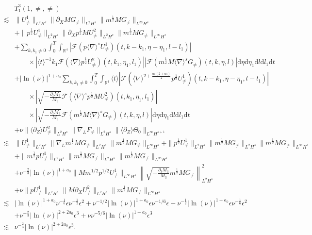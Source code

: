 \documentclass[12pt]{article}
\def\d{\mathrm{d}}
\newcommand{\wtb}{\langle\partial_Z\rangle }
\numberwithin{equation}{section}
\begin{document}
	\begin{align*}
		&T^3_1(1,\neq,\neq)\\\lesssim&\|U^1_{\neq}\|_{L^2H^s}\|\partial_XMG_{\neq}\|_{L^2H^s}\|m^{\frac{1}{2}}MG_{\neq}\|_{L^\infty H^{s}}\\
		&+\|p^{\frac{1}{2}}U^1_{\neq}\|_{L^2H^s}\|\partial_Xp^{\frac{1}{2}}MU^2_{\neq}\|_{L^2H^s}\|m^{\frac{1}{2}}MG_{\neq}\|_{L^\infty H^{s}}\\
		&+\sum_{k,k_1\neq0}\int_{0}^{T}\int_{\mathbb{R}^4}|\mathcal{F}(p\langle\nabla\rangle^s U^1_{\neq})(t,k-k_1,\eta-\eta_1,l-l_1)|\\
		&\quad\quad\times|\langle t\rangle^{-1}k_1\mathcal{F}(\langle \nabla\rangle p^{\frac{1}{2}}U^2_{\neq})(t,k_1,\eta_1,l_1)||\mathcal{F}(m^{\frac{1}{2}}M\langle \nabla\rangle^{s}G_{\neq})(t,k,\eta,l)|\d\eta \d\eta_1 \d l \d l_1 \d t\\
		&+|\ln(\nu)|^{1+a_0}\sum_{k,k_1\neq0}\int_{0}^{T}\int_{\mathbb{R}^4} \langle t\rangle \left|\mathcal{F}(\langle\nabla\rangle^{2+\frac{a_0(2+a_0)}{2}} p^{\frac12} U^1_{\neq})(t,k-k_1,\eta-\eta_1,l-l_1)\right|\\
		&\quad\quad\times\left|\sqrt{-\frac{\partial_tM_3}{M_3}}\mathcal{F}(\langle \nabla \rangle^sp^{\frac{1}{2}}MU^2_{\neq})(t,k_1,\eta_1,l_1)\right|\\
		&\quad\quad\times\left|\sqrt{-\frac{\partial_tM_3}{M_3}}\mathcal{F}(m^{\frac{1}{2}}M \langle \nabla\rangle^{s}G_{\neq})(t,k,\eta,l)\right| \d\eta \d\eta_1 \d l \d l_1 \d t\\
		&+\nu\|\wtb U^2_{\neq}\|_{L^2H^s}\|\nabla_LF_{\neq}\|_{L^2H^s}\|\wtb\Theta_0\|_{L^{\infty} H^{s+1}}\\
		\lesssim&
		\|U^1_{\neq}\|_{L^2H^s}\|\nabla_L m^{\frac{1}{2}}MG_{\neq}\|_{L^2H^s}\|m^{\frac{1}{2}}MG_{\neq}\|_{L^\infty H^{s}}+\|p^{\frac{1}{2}}U^1_{\neq}\|_{L^2H^s}\|m^{\frac{1}{2}}MG_{\neq}\|_{L^2H^s}\|m^{\frac{1}{2}}MG_{\neq}\|_{L^\infty H^{s}}\\
		&+\|m^{\frac{1}{2}}pU^1_{\neq}\|_{L^2H^s}\|m^{\frac{1}{2}}MG_{\neq}\|_{L^2H^s}\|m^{\frac{1}{2}}MG_{\neq}\|_{L^\infty H^{s}}\\
        &+\nu^{-\frac{2}{3}}|\ln(\nu)|^{1+a_0}\|M m^{1/2}p^{1/2}U^1_{\neq}\|_{L^\infty H^s}\left\|\sqrt{-\frac{\partial_tM_3}{M_3}}m^{\frac{1}{2}}MG_{\neq}\right\|^2_{L^2H^s}\\
		&+\nu\|p U^1_{\neq}\|_{L^2H^s}\|M\partial_XU^2_{\neq}\|_{L^2H^s}\|m^{\frac{1}{2}}MG_{\neq}\|_{L^{\infty} H^{s}}\\
		\lesssim&|\ln(\nu)|^{1+a_0}\nu^{-\frac{1}{6}}\epsilon\nu^{-\frac{1}{2}}\epsilon^2+\nu^{-1/2}|\ln(\nu)|^{1+a_0}\epsilon\nu^{-1/6}\epsilon+\nu^{-\frac{1}{2}}|\ln(\nu)|^{1+a_0}\epsilon\nu^{-\frac{1}{6}}\epsilon^2\\
        &+\nu^{-\frac{2}{3}}|\ln(\nu)|^{2+2a_0}\epsilon^3+\nu\nu^{-5/6}|\ln(\nu)|^{1+a_0}\epsilon^3\\
		\lesssim&\nu^{-\frac{2}{3}}|\ln(\nu)|^{2+2a_0}\epsilon^3.
	\end{align*}
\end{document}
